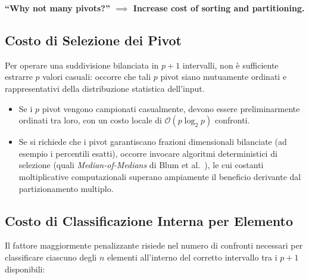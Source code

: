 \begin{center}
  \bfseries ``Why not many pivots?'' $\implies$ Increase cost of sorting and partitioning.
\end{center}

\subsection{Costo di Selezione dei Pivot}
Per operare una suddivisione bilanciata in $p + 1$ intervalli, non è sufficiente estrarre $p$ valori casuali: occorre che tali $p$ pivot siano mutuamente ordinati e rappresentativi della distribuzione statistica dell'input.
\begin{itemize}
  \item Se i $p$ pivot vengono campionati casualmente, devono essere preliminarmente ordinati tra loro, con un costo locale di $\mathcal{O}(p \log_2 p)$ confronti.
  \item Se si richiede che i pivot garantiscano frazioni dimensionali bilanciate (ad esempio i percentili esatti), occorre invocare algoritmi deterministici di selezione (quali \textit{Median-of-Medians} di Blum et al.~\cite{blum1973}), le cui costanti moltiplicative computazionali superano ampiamente il beneficio derivante dal partizionamento multiplo.
\end{itemize}

\subsection{Costo di Classificazione Interna per Elemento}
Il fattore maggiormente penalizzante risiede nel numero di confronti necessari per classificare ciascuno degli $n$ elementi all'interno del corretto intervallo tra i $p + 1$ disponibili:

